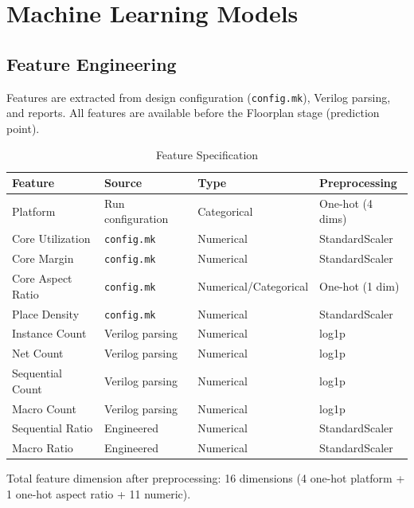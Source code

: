 \documentclass[10pt,conference]{IEEEtran}
\newcommand{\ORFS}{\text{ORFS}}
\begin{document}
\section{Machine Learning Models}
\label{sec:ml_models}

\subsection{Feature Engineering}
\label{sec:feature_engineering}

Features are extracted from design configuration (\texttt{config.mk}), Verilog parsing, and \ORFS{} reports. All features are available before the Floorplan stage (prediction point).

\begin{table}[t]
\centering
\caption{Feature Specification}
\label{tab:feature_spec}
\small
\setlength{\tabcolsep}{2.5pt}
\renewcommand{\arraystretch}{1.12}
\begin{tabularx}{\columnwidth}{@{}>{\raggedright\arraybackslash}p{}>{\raggedright\arraybackslash}p{}>{\raggedright\arraybackslash}p{}X@{}}
\toprule
Feature & Source & Type & Preprocessing \\
\midrule
Platform & Run configuration & Categorical & One-hot (4 dims) \\
Core Utilization & \texttt{config.mk} & Numerical & StandardScaler \\
Core Margin & \texttt{config.mk} & Numerical & StandardScaler \\
Core Aspect Ratio & \texttt{config.mk} & Numerical/Categorical & One-hot (1 dim) \\
Place Density & \texttt{config.mk} & Numerical & StandardScaler \\
Instance Count & Verilog parsing & Numerical & log1p \\
Net Count & Verilog parsing & Numerical & log1p \\
Sequential Count & Verilog parsing & Numerical & log1p \\
Macro Count & Verilog parsing & Numerical & log1p \\
Sequential Ratio & Engineered & Numerical & StandardScaler \\
Macro Ratio & Engineered & Numerical & StandardScaler \\
\bottomrule
\end{tabularx}
\end{table}

Total feature dimension after preprocessing: 16 dimensions (4 one-hot platform + 1 one-hot aspect ratio + 11 numeric).
\end{document}
